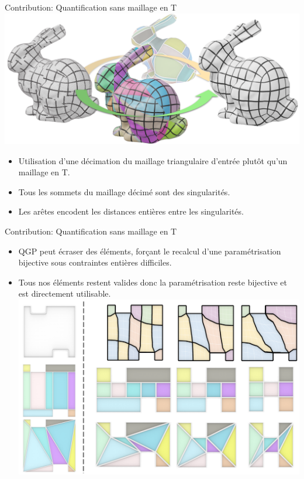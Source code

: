 

\begin{frame}{Contribution: Quantification sans maillage en T}
    \centering
    \includegraphics[width=\linewidth]{yoimg/teaser.PNG}
	\vspace{-1.5em}
	\begin{itemize}
		\item Utilisation d'une décimation du maillage triangulaire d'entrée plutôt qu'un maillage en T.
		\item Tous les sommets du maillage décimé sont des singularités.
		\item Les arêtes encodent les distances entières entre les singularités.
    \end{itemize}
\end{frame}

\begin{frame}{Contribution: Quantification sans maillage en T}
    \begin{itemize}
        \item QGP peut écraser des éléments, forçant le recalcul d'une paramétrisation bijective sous contraintes entières difficiles.\\
        \item Tous nos éléments restent valides donc la paramétrisation reste bijective et est directement utilisable.\\
        \centering
        \includegraphics[width=0.75\linewidth]{yoimg/restriction.png}
    \end{itemize}
\end{frame}

